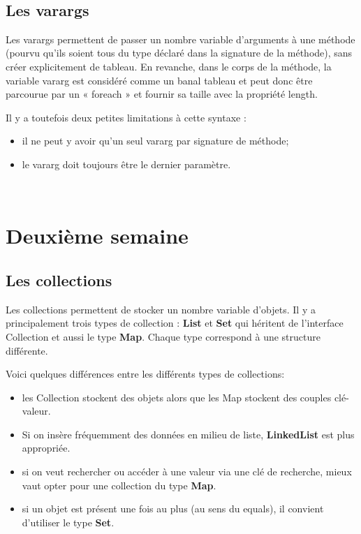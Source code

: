 \documentclass[12pt]{report}
\begin{document}
~\\
\subsection{Les varargs}
Les varargs permettent de passer un nombre variable d’arguments à une méthode (pourvu qu’ils soient tous du type déclaré dans la signature de la méthode), sans créer explicitement de tableau. En revanche, dans le corps de la méthode, la variable vararg est considéré comme un banal tableau et peut donc être parcourue par un « foreach » et fournir sa taille avec la propriété length.\newline

Il y a toutefois deux petites limitations à cette syntaxe :

\begin{itemize} 
\item il ne peut y avoir qu’un seul vararg par signature de méthode;
\item le vararg doit toujours être le dernier paramètre.
\end{itemize}

~\\
\section{Deuxième semaine}

\subsection{Les collections}
Les collections permettent de stocker un nombre variable d'objets. Il y a principalement trois types de collection : \textbf{List} et \textbf{Set} qui héritent de l'interface Collection et aussi le type \textbf{Map}. Chaque type correspond à une structure différente.\newline

Voici quelques différences entre les différents types de collections:
\begin{itemize}
\item les Collection stockent des objets alors que les Map stockent des couples clé-valeur.
\item Si on insère fréquemment des données en milieu de liste, \textbf{LinkedList} est plus appropriée.
\item si on veut rechercher ou accéder à une valeur via une clé de recherche, mieux vaut opter pour une collection du type \textbf{Map}.
\item si un objet est présent une fois au plus (au sens du equals), il convient d'utiliser le type \textbf{Set}.
\end{itemize}
\end{document}
